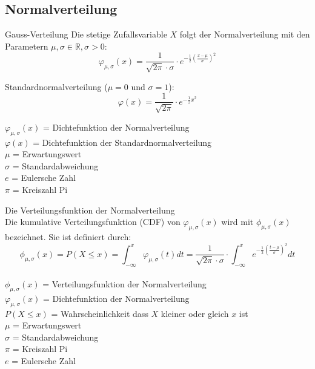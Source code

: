 \subsection{Normalverteilung}
\begin{definition}{Gauss-Verteilung}
Die stetige Zufallsvariable $X$ folgt der Normalverteilung mit den Parametern $\mu, \sigma \in \mathbb{R}, \sigma>0$:
$$
\varphi_{\mu,\sigma}(x)=\frac{1}{\sqrt{2\pi} \cdot \sigma} \cdot e^{-\frac{1}{2}(\frac{x-\mu}{\sigma})^2}
$$

Standardnormalverteilung ($\mu=0$ und $\sigma=1$):
$$
\varphi(x)=\frac{1}{\sqrt{2\pi}} \cdot e^{-\frac{1}{2}x^2}
$$

$\varphi_{\mu,\sigma}(x)$ = Dichtefunktion der Normalverteilung\\
$\varphi(x)$ = Dichtefunktion der Standardnormalverteilung\\

$\mu$ = Erwartungswert\\
$\sigma$ = Standardabweichung\\
$e$ = Eulersche Zahl\\
$\pi$ = Kreiszahl Pi\\
\end{definition}
\begin{definition}{Die Verteilungsfunktion der Normalverteilung}\\
Die kumulative Verteilungsfunktion (CDF) von $\varphi_{\mu,\sigma}(x)$ wird mit $\phi_{\mu,\sigma}(x)$ bezeichnet. Sie ist definiert durch:
$$
\phi_{\mu,\sigma}(x) = P(X \leq x) = \int_{-\infty}^x \varphi_{\mu,\sigma}(t)dt = \frac{1}{\sqrt{2\pi} \cdot \sigma} \cdot \int_{-\infty}^x e^{-\frac{1}{2}(\frac{t-\mu}{\sigma})^2} dt
$$
\\
$\phi_{\mu,\sigma}(x)$ = Verteilungsfunktion der Normalverteilung\\
$\varphi_{\mu,\sigma}(x)$ = Dichtefunktion der Normalverteilung\\
$P(X \leq x)$ = Wahrscheinlichkeit dass $X$ kleiner oder gleich $x$ ist\\
$\mu$ = Erwartungswert\\
$\sigma$ = Standardabweichung\\
$\pi$ = Kreiszahl Pi\\
$e$ = Eulersche Zahl\\
\end{definition}

